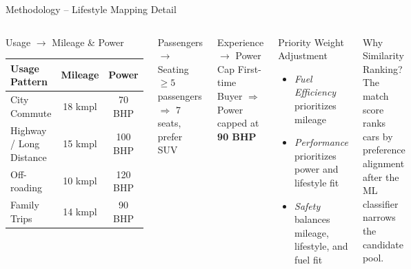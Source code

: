 \documentclass[aspectratio=169]{beamer}
\begin{document}
\begin{frame}{Methodology -- Lifestyle Mapping Detail}
  \begin{columns}[t]
      \begin{block}{Usage $\rightarrow$ Mileage \& Power}
        \vspace{0.3em}
        \begin{tabular}{lcc}
          \toprule
          \textbf{Usage Pattern} & \textbf{Mileage} & \textbf{Power} \\
          \midrule
          City Commute            & 18 kmpl & 70 BHP  \\
          Highway / Long Distance & 15 kmpl & 100 BHP \\
          Off-roading             & 10 kmpl & 120 BHP \\
          Family Trips            & 14 kmpl & 90 BHP  \\
          \bottomrule
        \end{tabular}
      \end{block}
      \vspace{0.5em}
      \begin{block}{Passengers $\rightarrow$ Seating}
        $\geq5$ passengers $\Rightarrow$ 7 seats, prefer SUV
      \end{block}

      \begin{block}{Experience $\rightarrow$ Power Cap}
        First-time Buyer $\Rightarrow$ Power capped at \textbf{90 BHP}
      \end{block}
      \vspace{0.5em}
      \begin{block}{Priority Weight Adjustment}
        \begin{itemize}
          \item \textit{Fuel Efficiency} prioritizes mileage
          \item \textit{Performance} prioritizes power and lifestyle fit
          \item \textit{Safety} balances mileage, lifestyle, and fuel fit
        \end{itemize}
      \end{block}
      \vspace{0.5em}
      \begin{alertblock}{Why Similarity Ranking?}
        \small The match score ranks cars by preference alignment after the ML classifier narrows the candidate pool.
      \end{alertblock}
  \end{columns}
\end{frame}
\end{document}
